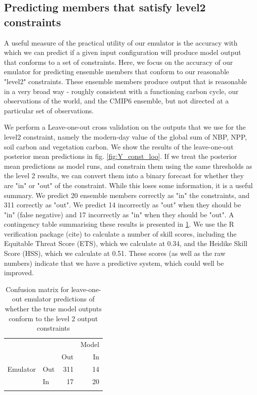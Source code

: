 \documentclass[gmd, manuscript]{copernicus}
\begin{document}
\subsection{Predicting members that satisfy level2 constraints} 

A useful measure of the practical utility of our emulator is the accuracy with which we can predict if a given input configuration will produce model output that conforms to a set of constraints. Here, we focus on the accuracy of our emulator for predicting ensemble members that conform to our reasonable "level2" constraints. These ensemble members produce output that is reasonable in a very broad way - roughly consistent with a functioning carbon cycle, our observations of the world, and the CMIP6 ensemble, but not directed at a particular set of observations.

We perform a Leave-one-out cross validation on the outputs that we use for the level2 constraint, namely the modern-day value of the global sum of NBP, NPP, soil carbon and vegetation carbon. We show the results of the leave-one-out posterior mean predictions in fig. \ref{fig:Y_const_loo}. If we treat the posterior mean predictions as model runs, and constrain them using the same thresholds as the level 2 results, we can convert them into a binary forecast for whether they are "in" or "out" of the constraint. While this loses some information, it is a useful summary. We predict 20 ensemble members correctly as "in" the constraints, and 311 correctly as "out". We predict 14 incorrectly as "out" when they should be "in" (false negative) and 17 incorrectly as "in" when they should be "out". A contingency table summarising these results is presented in \ref{table:level_2_contingency}. We use the R verification package (cite) to calculate a number of skill scores, including the Equitable Threat Score (ETS), which we calculate at 0.34, and the Heidike Skill Score (HSS), which we calculate at 0.51. These scores (as well as the raw numbers) indicate that we have a predictive system, which could well be improved.

\begin{table}[t]
\caption{Confusion matrix for leave-one-out emulator predictions of whether the true model outputs conform to the level 2 output constraints}
\label{table:level_2_contingency}
\begin{tabular}{l l r r}
\tophline
 &  &  & Model \\ 
& & Out &  In\\
Emulator & Out & 311 &  14 \\
 & In & 17 & 20 \\

\bottomhline
\end{tabular}
\belowtable{} %

\end{table}
\end{document}
